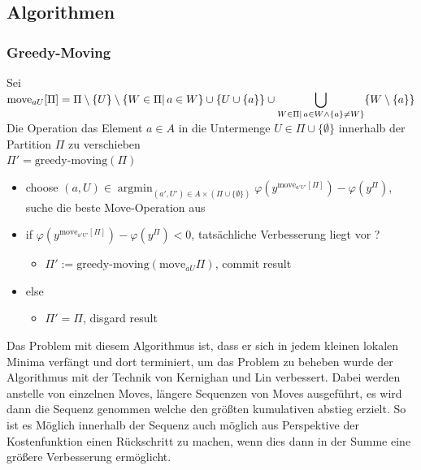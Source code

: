 \documentclass[12pt,a4paper]{article}
\DeclareMathOperator*{\argmin}{argmin}
\newcommand{\nl}{\\[0.1cm]}
\begin{document}
\subsection{Algorithmen}
\subsubsection{Greedy-Moving}
Sei $\displaystyle \text{move}_{aU}[\Pi] = \Pi \setminus \{U\} \setminus \{W\in\Pi \vert \, a\in W\}\\
\cup\{U\cup \{a\}\}\\
\cup \bigcup_{W\in\Pi \vert \, a\in W \land \{a\} \neq W\}} \{W\setminus \{a\}\}$\\
Die Operation das Element $a\in A$ in die Untermenge $U \in \Pi \cup \{\emptyset\}$ innerhalb der Partition $\Pi$ zu verschieben\nl
$\Pi' = \text{greedy-moving}(\Pi)$
\begin{itemize}
\item choose $\displaystyle (a,U) \in \argmin_{(a',U')\in A\times(\Pi \cup \{\emptyset\})} \varphi(y^{\text{move}_{a'U'}[\Pi]}) - \varphi(y^\Pi)$, suche die beste Move-Operation aus
\item if $\varphi(y^{\text{move}_{a'U'}[\Pi]}) - \varphi(y^\Pi) < 0$, tatsächliche Verbesserung liegt vor ?
\begin{itemize}
\item $\Pi' := \text{greedy-moving}(\text{move}_{aU}\Pi)$, commit result
\end{itemize}
\item else
\begin{itemize}
\item $\Pi' = \Pi$, disgard result
\end{itemize}
\end{itemize}
Das Problem mit diesem Algorithmus ist, dass er sich in jedem kleinen lokalen Minima verfängt und dort terminiert, um das Problem zu beheben wurde der Algorithmus mit der Technik von Kernighan und Lin verbessert. Dabei werden anstelle von einzelnen Moves, längere Sequenzen von Moves ausgeführt, es wird dann die Sequenz genommen welche den größten kumulativen abstieg erzielt. So ist es Möglich innerhalb der Sequenz auch möglich aus Perspektive der Kostenfunktion einen Rückschritt zu machen, wenn dies dann in der Summe eine größere Verbesserung ermöglicht.\nl
\end{document}
